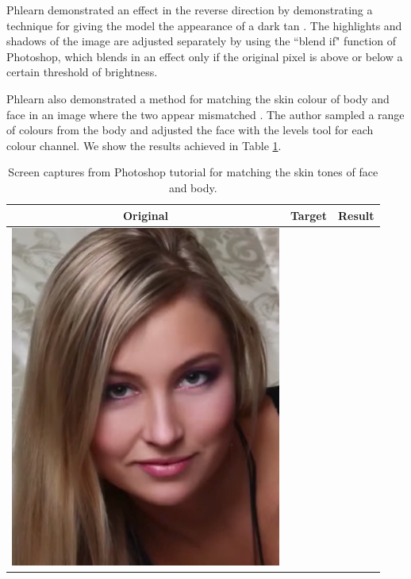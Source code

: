 Phlearn demonstrated an effect in the reverse direction by demonstrating a technique for giving the model the appearance of a dark tan \cite{photoshop:tan}. The highlights and shadows of the image are adjusted separately by using the ``blend if" function of Photoshop, which blends in an effect only if the original pixel is above or below a certain threshold of brightness.

Phlearn also demonstrated a method for matching the skin colour of body and face in an image where the two appear mismatched \cite{photoshop:match_body}. The author sampled a range of colours from the body and adjusted the face with the levels tool for each colour channel. We show the results achieved in Table \ref{tab:match_body_demo}.

\begin{longtable}{|c|c|c|}
    \caption{Screen captures from Photoshop tutorial for matching the skin tones of face and body. \label{tab:match_body_demo}}\\
    \hline
    Original & Target & Result \\
    \hline
  \begin{minipage}{.29\textwidth}
    \includegraphics[width=\textwidth,height=\textheight,keepaspectratio]{images/match_body_orig}

\end{minipage}
\end{longtable}
